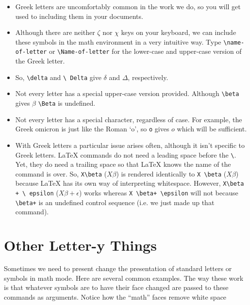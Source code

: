 \begin{itemize}
\item Greek letters are uncomfortably common in the work we do, so you
  will get used to including them in your documents.

\item Although there are neither $\zeta$ nor $\chi$ keys on your
  keyboard, we can include these symbols in the math environment in a
  very intuitive way. Type \texttt{\textbackslash name-of-letter}
  or \texttt{\textbackslash Name-of-letter} for the lower-case and
  upper-case version of the Greek letter.

\item So, \texttt{\textbackslash delta} and \texttt{\textbackslash
    Delta} give $\delta$ and $\Delta$, respectively.

\item Not every letter has a special upper-case version
  provided. Although \texttt{\textbackslash beta} gives $\beta$
  \texttt{\textbackslash Beta} is undefined.

\item Not every letter has a special character, regardless of
  case. For example, the Greek omicron is just like the Roman `o', so
  \texttt{o} gives $o$ which will be sufficient.

\item With Greek letters a particular issue arises often, although it
  isn't specific to Greek letters. \LaTeX{} commands do not need a
  leading space before the \texttt{\textbackslash}. Yet, they do need
  a trailing space so that \LaTeX{} knows the name of the command is
  over. So, \texttt{X\textbackslash beta} ($X\beta$) is rendered
  identically to \texttt{X~\textbackslash beta} ($X \beta$)
  because \LaTeX{} has its own way of interpreting
  whitespace. However, \texttt{X\textbackslash beta + \textbackslash
    epsilon} ($X\beta + \epsilon$) works whereas
  \texttt{X~\textbackslash beta+ \textbackslash epsilon} will not
  because \texttt{\textbackslash beta+} is an undefined control
  sequence (i.e. we just made up that command).

\end{itemize}
\section{Other Letter-y Things}

Sometimes we need to present change the presentation of standard
letters or symbols in math mode. Here are several common examples. The
way these work is that whatever symbols are to have their face changed
are passed to these commands as arguments. Notice how the ``math''
faces remove white space

